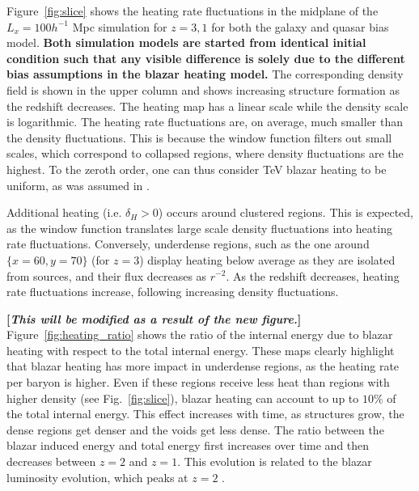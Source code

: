 \documentclass[twocolumns]{emulateapj}
\newcommand\Cc[1]{{\color{blue} \bf #1}} %
\begin{document}
Figure~\ref{fig:slice} shows the heating rate fluctuations in the midplane of the $L_x=100h^{-1}$  Mpc simulation for $z=3,1$ for both the galaxy and quasar bias model. \Cc{Both simulation models are started from identical initial condition such that any visible difference is solely due to the different bias assumptions in the blazar heating model.} The corresponding density field is shown in the upper column and shows increasing structure formation as the redshift decreases.  The heating map has a linear scale while the density scale is logarithmic. The heating rate fluctuations are, on average, much smaller than the density fluctuations. This is because the window function filters out small scales, which correspond to collapsed regions,  where density fluctuations are the highest. To the zeroth order, one can thus consider TeV blazar heating to be uniform, as was assumed in \citet{2012ApJ...752...23C}.



Additional heating (i.e. $\delta_H>0$) occurs around clustered regions. This is expected, as the window function translates large scale density fluctuations into heating rate fluctuations.  Conversely, underdense regions, such as the one around $\{x=60,y=70\}$ (for $z=3$) display heating below average as they are isolated from sources, and their flux decreases as $r^{-2}$. As the redshift decreases, heating rate fluctuations increase, following increasing density fluctuations.

\Cc{[{\em This will be modified as a result of the new figure.}]} Figure~\ref{fig:heating_ratio} shows the ratio of the internal energy due to  blazar heating with respect to the total internal energy.  These maps clearly highlight that blazar heating has more impact in underdense regions, as the heating rate per baryon is higher. Even if these regions receive less heat than regions with higher density (see Fig.~\ref{fig:slice}), blazar heating can account to up to $10\%$ of the total internal energy.  This effect increases with time, as structures grow, the dense regions get denser and the voids get less dense. The ratio between the blazar induced energy and total energy first increases over time and then decreases between $z=2$ and $z=1$.  This evolution is related to the blazar luminosity evolution, which peaks at $z=2$ \citep{2012ApJ...752...23C}.
\end{document}
